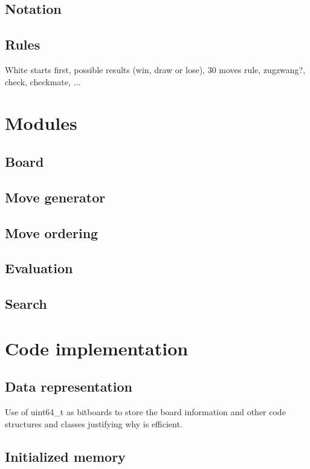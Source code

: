 \subsection{Notation}

\subsection{Rules}

White starts first, possible results (win, draw or lose), 30 moves rule, zugzwang?, check, checkmate, ...

\section{Modules}
\label{sec:modules}

\subsection{Board}

\subsection{Move generator}

\subsection{Move ordering}

\subsection{Evaluation}

\subsection{Search}

\section{Code implementation}

\subsection{Data representation}

Use of uint64\_t as bitboards to store the board information and other code structures and classes justifying why is efficient.

\subsection{Initialized memory}


